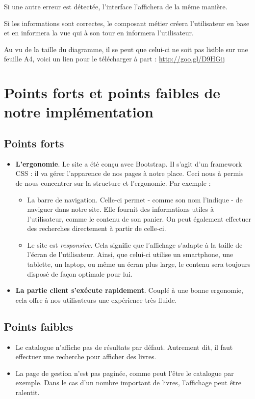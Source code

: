 	Si une autre erreur est détectée, l'interface l'affichera de la même manière.

	Si les informations sont correctes, le composant métier créera l'utilisateur en base et en informera la vue qui à son tour en informera l'utilisateur.

	\clearpage
	Au vu de la taille du diagramme, il se peut que celui-ci ne soit pas lisible sur une feuille A4, voici un lien pour le télécharger à part : \href{http://goo.gl/D9HGij}{http://goo.gl/D9HGij}

\section{Points forts et points faibles de notre implémentation}

	\subsection{Points forts}
	\begin{itemize}

		\item \textbf{L'ergonomie}. Le site a été conçu avec Bootstrap. Il s'agit d'un framework CSS : il va gérer l'apparence de nos pages à notre place. Ceci nous à permis de nous concentrer sur la structure et l'ergonomie. Par exemple :

		\begin{itemize}
			\item La barre de navigation. Celle-ci permet - comme son nom l'indique - de naviguer dans notre site. Elle fournit des informations utiles à l'utilisateur, comme le contenu de son panier. On peut également effectuer des recherches directement à partir de celle-ci.

			\item Le site est \emph{responsive}. Cela signifie que l'affichage s'adapte à la taille de l'écran de l'utilisateur. Ainsi, que celui-ci utilise un smartphone, une tablette, un laptop, ou même un écran plus large, le contenu sera toujours disposé de façon optimale pour lui.
		\end{itemize}

		\item \textbf{La partie client s'exécute rapidement}. Couplé à une bonne ergonomie, cela offre à nos utilisateurs une expérience très fluide.

	\end{itemize}


	\subsection{Points faibles}
	\begin{itemize}
		\item Le catalogue n'affiche pas de résultats par défaut. Autrement dit, il faut effectuer une recherche pour afficher des livres.

		\item La page de gestion n'est pas paginée, comme peut l'être le catalogue par exemple. Dans le cas d'un nombre important de livres, l'affichage peut être ralentit.
	\end{itemize}
